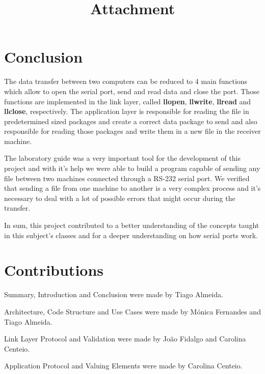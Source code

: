 \documentclass[a4paper]{article}
\begin{document}
\section{Conclusion}
The data transfer between two computers can be reduced to 4 main functions which allow to open the serial port, send and read data and close the port. Those functions are implemented in the link layer, called \textbf{llopen}, \textbf{llwrite}, \textbf{llread} and \textbf{llclose}, respectively. The application layer is responsible for reading the file in predetermined sized packages and create a correct data package to send and also responsible for reading those packages and write them in a new file in the receiver machine.

The laboratory guide was a very important tool for the development of this project and with it's help we were able to build a program capable of sending any file between two machines connected through a RS-232 serial port. We verified that sending a file from one machine to another is a very complex process and it's necessary to deal with a lot of possible errors that might occur during the transfer. 

In sum, this project contributed to a better understanding of the concepts taught in this subject's classes and for a deeper understanding on how serial ports work.

\section{Contributions}

Summary, Introduction and Conclusion were made by Tiago Almeida.

Architecture, Code Structure and Use Cases were made by Mónica Fernandes and Tiago Almeida.

Link Layer Protocol and Validation were made by João Fidalgo and Carolina Centeio.

Application Protocol and Valuing Elements were made by Carolina Centeio.

\newpage
\clearpage
\vspace*{\fill}
\begin{center}
\begin{minipage}{0.5\textwidth}
\title{\Huge\textbf{Attachment}}
\end{minipage}
\end{center}
\vfill %
\clearpage
\newpage
\end{document}
